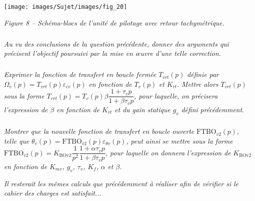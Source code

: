 \documentclass[10pt,fleqn]{article} %
\begin{document}
\begin{center}
\texttt{[image: images/Sujet/images/fig\_20]}

\textit{Figure 8 -- Schéma-blocs de l'unité de pilotage avec retour tachymétrique.}
\end{center}



\subparagraph{}
\textit{Au vu des conclusions de la question précédente, donner des arguments qui précisent l'objectif
poursuivi par la mise en \oe{}uvre d'une telle correction.}
\ifprof
\begin{corrige}
\end{corrige}
\else
\fi


\subparagraph{}
\textit{Exprimer la fonction de transfert en boucle fermée $T_{vrt}(p)$ définie par $\Omega_v(p)=T_{vrt}(p)\varepsilon_{cv}(p)$ en fonction de $T_v (p)$ et $K_{rt}$. Mettre alors $T_{vrt}(p)$ sous la forme $T_{vrt}(p)=T_v(p)\beta\dfrac{1+\tau_v p}{1+\beta \tau_v p}$, pour laquelle, on précisera l'expression de $\beta$ en fonction de $K_{rt}$ et du gain statique $g_v$ défini précédemment.}
\ifprof
\begin{corrige}
\end{corrige}
\else
\fi


\subparagraph{}
\textit{Montrer que la nouvelle fonction de transfert en boucle ouverte $\text{FTBO}_{v2}(p)$, telle que
$\theta_v(p)=\text{FTBO}_{v2}(p)\varepsilon_{\theta v}(p)$, peut ainsi se mettre sous la forme $\text{FTBO}_{v2}(p)=K_{\text{BOv2}}\dfrac{1}{p^2}\dfrac{1+\alpha \tau_v p}{1+\beta \tau_v p}$,  pour laquelle on donnera l'expression de $K_{\text{BOv2}}$ en fonction de $K_{mv}$, $g_v$, $\tau_v$, $K_f$, $\alpha$ et $\beta$.}

\ifprof
\begin{corrige}
\end{corrige}
\else
\fi

\vspace{1cm}

\textit{Il resterait les mêmes calculs que précédemment à réaliser afin de vérifier si le cahier des charges est satisfait...}
%


%
\end{document}
